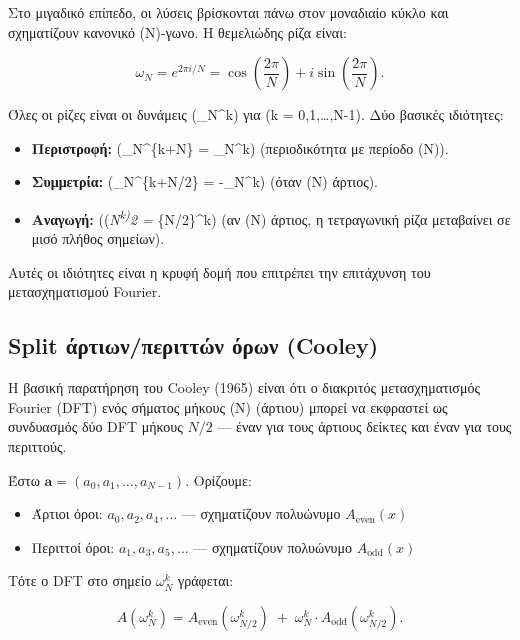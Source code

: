 \documentclass[a4paper, 11pt]{article}
\providecommand{\tightlist}{\setlength{\itemsep}{0pt}\setlength{\parskip}{0pt}}
\begin{document}
Στο μιγαδικό επίπεδο, οι λύσεις βρίσκονται πάνω στον μοναδιαίο κύκλο και
σχηματίζουν κανονικό (N)-γωνο. Η θεμελιώδης ρίζα είναι:

\[
\omega_N = e^{2\pi i / N} = \cos\left(\frac{2\pi}{N}\right) + i \sin\left(\frac{2\pi}{N}\right).
\]

Όλες οι ρίζες είναι οι δυνάμεις (\omega\_N\^{}k) για (k =
0,1,\dots,N-1). Δύο βασικές ιδιότητες:

\begin{itemize}
\tightlist
\item
  \textbf{Περιστροφή:} (\omega\_N\^{}\{k+N\} = \omega\_N\^{}k)
  (περιοδικότητα με περίοδο (N)).
\item
  \textbf{Συμμετρία:} (\omega\_N\^{}\{k+N/2\} = -\omega\_N\^{}k) (όταν
  (N) άρτιος).
\item
  \textbf{Αναγωγή:} ((\omega\emph{N\textsuperscript{k)}2 =
  \omega}\{N/2\}\^{}k) (αν (N) άρτιος, η τετραγωνική ρίζα μεταβαίνει σε
  μισό πλήθος σημείων).
\end{itemize}

Αυτές οι ιδιότητες είναι η κρυφή δομή που επιτρέπει την επιτάχυνση του
μετασχηματισμού Fourier.

\subsection{Split άρτιων/περιττών όρων
(Cooley)}\label{split-ux3acux3c1ux3c4ux3b9ux3c9ux3bdux3c0ux3b5ux3c1ux3b9ux3c4ux3c4ux3ceux3bd-ux3ccux3c1ux3c9ux3bd-cooley}

Η βασική παρατήρηση του Cooley (1965) είναι ότι ο διακριτός
μετασχηματισμός Fourier (DFT) ενός σήματος μήκους (N) (άρτιου) μπορεί να
εκφραστεί ως συνδυασμός δύο DFT μήκους \(N/2\) --- έναν για τους άρτιους
δείκτες και έναν για τους περιττούς.

Έστω \(\mathbf{a} = (a_0, a_1, \dots, a_{N-1})\). Ορίζουμε:

\begin{itemize}
\tightlist
\item
  Άρτιοι όροι: \(a_0, a_2, a_4, \dots\) --- σχηματίζουν πολυώνυμο
  \(A_{\text{even}}(x)\)
\item
  Περιττοί όροι: \(a_1, a_3, a_5, \dots\) --- σχηματίζουν πολυώνυμο
  \(A_{\text{odd}}(x)\)
\end{itemize}

Τότε ο DFT στο σημείο \(\omega_N^k\) γράφεται:

\[
A(\omega_N^k) = A_{\text{even}}(\omega_{N/2}^k) \;+\; \omega_N^k \cdot A_{\text{odd}}(\omega_{N/2}^k).
\]
\end{document}
